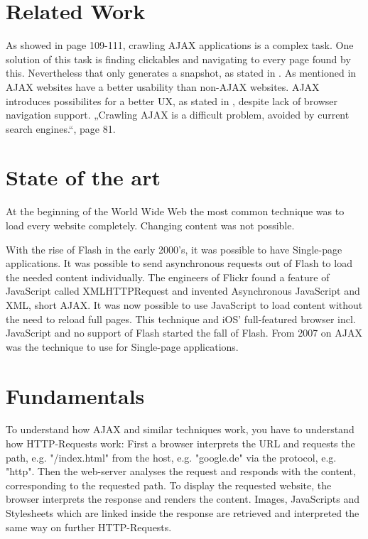\documentclass[f,bachelor,binding,twoside,palatino]{WeSTthesis}
\begin{document}
\section{Related Work}
  As showed in \cite{mesbah09} page 109-111, crawling AJAX applications is a complex task. One solution of this task is finding clickables and navigating to every page found by this. Nevertheless that only generates a snapshot, as stated in \cite[p. 124]{mesbah09}.
  As mentioned in \cite[p. 44]{roodt06} AJAX websites have a better usability than non-AJAX websites.
  AJAX introduces possibilites for a better UX, as stated in \cite{klugeKarglWeber07}, despite lack of browser navigation support.
  „Crawling AJAX is a difficult problem, avoided by current search engines.“\cite{matter08}, page 81.


\section{State of the art}
  At the beginning of the World Wide Web the most common technique was to load every website completely. Changing content was not possible.
    
  With the rise of Flash in the early 2000's, it was possible to have Single-page applications. It was possible to send asynchronous requests out of Flash to load the needed content individually.
  The engineers of Flickr found a feature of JavaScript called XMLHTTPRequest and invented Asynchronous JavaScript and XML, short AJAX. It was now possible to use JavaScript to load content without the need to reload full pages.
  This technique and iOS' full-featured browser incl. JavaScript and no support of Flash started the fall of Flash. From 2007 on AJAX was the technique to use for Single-page applications.
  
\section{Fundamentals}
  To understand how AJAX and similar techniques work, you have to understand how HTTP-Requests work:
  First a browser interprets the URL and requests the path, e.g. "/index.html" from the host, e.g. "google.de" via the protocol, e.g. "http".
  Then the web-server analyses the request and responds with the content, corresponding to the requested path.
  To display the requested website, the browser interprets the response and renders the content. 
  Images, JavaScripts and Stylesheets which are linked inside the response are retrieved and interpreted the same way on further HTTP-Requests.
\end{document}
